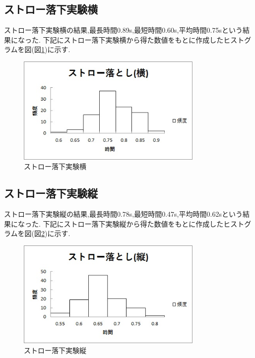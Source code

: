 \subsection{ストロー落下実験横}
ストロー落下実験横の結果,最長時間0.89s,最短時間0.60s,平均時間0.75sという結果になった.
下記にストロー落下実験横から得た数値をもとに作成したヒストグラムを図(図\ref{fig:wide})に示す.

\begin{figure}[htbp]
  \begin{center}
    \includegraphics[width=90mm]{wide.JPG}
    \end{center}
  \caption{ストロー落下実験横}
 \label{fig:wide}
\end{figure}

\subsection{ストロー落下実験縦}
ストロー落下実験縦の結果,最長時間0.78s,最短時間0.47s,平均時間0.62sという結果になった.
下記にストロー落下実験縦から得た数値をもとに作成したヒストグラムを図(図\ref{fig:vertical})に示す.

\begin{figure}[htbp]
  \begin{center}
    \includegraphics[width=90mm]{vertical.JPG}
    \end{center}
  \caption{ストロー落下実験縦}
 \label{fig:vertical}
\end{figure}

